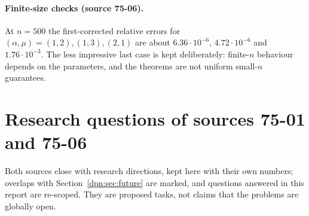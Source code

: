 \documentclass[11pt]{article}
\numberwithin{equation}{section}
\theoremstyle{definition}\newtheorem{definition}[theorem]{Definition}
\theoremstyle{remark}\newtheorem{remark}[theorem]{Remark}
\newcommand{\src}[1]{\textup{(source #1)}}
\begin{document}
\paragraph{Finite-size checks \src{75-06}.}
At $n=500$ the first-corrected relative errors for
$(\alpha,\mu)=(1,2),(1,3),(2,1)$ are about $6.36\cdot10^{-6}$,
$4.72\cdot10^{-6}$ and $1.76\cdot10^{-3}$.  The less impressive last case is
kept deliberately: finite-$n$ behaviour depends on the parameters, and the
theorems are not uniform small-$n$ guarantees.

\section{Research questions of sources 75-01 and 75-06}\label{dpn:sec:b75questions}
Both sources close with research directions, kept here with their own
numbers; overlaps with Section~\ref{dpn:sec:future} are marked, and questions
answered in this report are re-scoped.  They are proposed tasks, not claims
that the problems are globally open.
\end{document}
